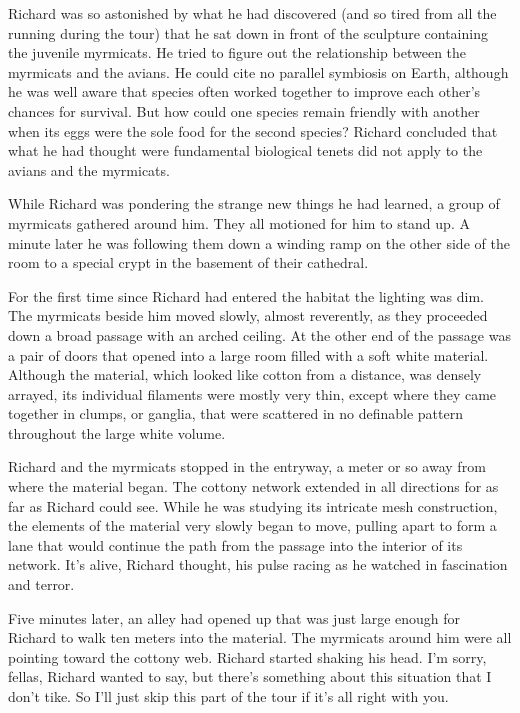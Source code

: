\documentclass[]{article}
\begin{document}
{{Richard was so astonished by what he had discovered (and so tired from all the running during the tour) that he sat down in front of the sculpture containing the juvenile myrmicats.  He tried to figure out the relationship between the myrmicats and the avians.  He could cite no parallel symbiosis on Earth, although he was well aware that species often worked together to improve each other’s chances for survival.  But how could one species remain friendly with another when its eggs were the sole food for the second species? Richard concluded that what he had thought were fundamental biological tenets did not apply to the avians and the myrmicats.

While Richard was pondering the strange new things he had learned, a group of myrmicats gathered around him.  They all motioned for him to stand up.  A minute later he was following them down a winding ramp on the other side of the room to a special crypt in the basement of their cathedral.

For the first time since Richard had entered the habitat the lighting was dim.  The myrmicats beside him moved slowly, almost reverently, as they proceeded down a broad passage with an arched ceiling.  At the other end of the passage was a pair of doors that opened into a large room filled with a soft white material.  Although the material, which looked like cotton from a distance, was densely arrayed, its individual filaments were mostly very thin, except where they came together in clumps, or ganglia, that were scattered in no definable pattern throughout the large white volume.

Richard and the myrmicats stopped in the entryway, a meter or so away from where the material began.  The cottony network extended in all directions for as far as Richard could see.  While he was studying its intricate mesh construction, the elements of the material very slowly began to move, pulling apart to form a lane that would continue the path from the passage into the interior of its network.  It’s alive, Richard thought, his pulse racing as he watched in fascination and terror.

Five minutes later, an alley had opened up that was just large enough for Richard to walk ten meters into the material.  The myrmicats around him were all pointing toward the cottony web.  Richard started shaking his head.  I’m sorry, fellas, Richard wanted to say, but there’s something about this situation that I don’t tike.  So I’ll just skip this part of the tour if it’s all right with you.

}}
\end{document}
